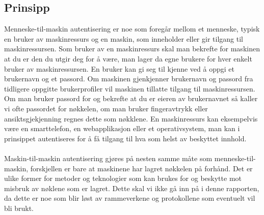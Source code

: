 \subsection*{Prinsipp}
Menneske-til-maskin autentisering er noe som foregår mellom et menneske, typisk en bruker av maskinressurs og en maskin, som inneholder eller gir tilgang til maskinressursen. Som bruker av en maskinressurs skal man bekrefte for maskinen at du er den du utgir deg for å være, man lager da egne brukere for hver enkelt bruker av maskinressursen. En bruker kan gi seg til kjenne ved å oppgi et brukernavn og et passord. Om maskinen gjenkjenner brukernavn og passord fra tidligere oppgitte brukerprofiler vil maskinen tillatte tilgang til maskinressursen. Om man bruker passord for og bekrefte at du er eieren av brukernavnet så kaller vi ofte passordet for nøkkelen, om man bruker fingeravtrykk eller ansiktsgjekjenning regnes dette som nøkklene. En maskinressurs kan eksempelvis være en smarttelefon, en webapplikasjon eller et operativsystem, man kan i prinsippet autentiseres for å få tilgang til hva som helst av beskyttet innhold.
\\
\\
Maskin-til-maskin autentisering gjøres på nesten samme måte som menneske-til-maskin, forskjellen er bare at maskinene har lagret nøkkelen på forhånd. Det er ulike former for metoder og teknologier som kan brukes for og beskytte mot misbruk av nøklene som er lagret. Dette skal vi ikke gå inn på i denne rapporten, da dette er noe som blir løst av rammeverkene og protokollene som eventuelt vil bli brukt.  

